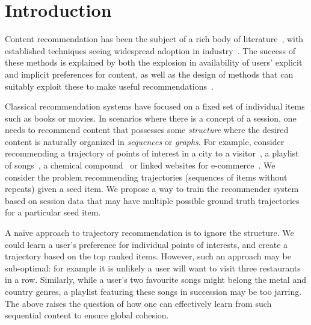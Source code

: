 
\section{Introduction}
\label{sec:intro}

Content recommendation has been the subject of a rich body of literature~\citep{Goldberg:1992,Sarwar:2001,Koren:2010},
with established techniques seeing widespread adoption in industry~\citep{Linden:2003,Agarwal:2013,Amatriain:2015,Gomez-Uribe:2015}.
The success of these methods is explained by both the explosion in availability of users' explicit and implicit preferences for content,
as well as the design of methods that can suitably exploit these to make useful recommendations~\citep{Koren:2009}.

Classical recommendation systems have focused on a fixed set of individual items such as books or movies. In scenarios where there is a concept of a session,
one needs to recommend content that possesses some \emph{structure}
where the desired content is naturally organized in
\emph{sequences} or {\em graphs}.
For example, consider %
recommending a trajectory of points of interest in a city to a visitor~\citep{lu2010photo2trip,lu2012personalized,ijcai15,cikm16paper},
a playlist of songs~\citep{McFee:2011,chen2012playlist,hidasi2015session,choi2016towards},
a chemical compound~\cite{dehaspe1998finding} or linked websites for e-commerce~\cite{antikacioglu2015recommendation}.
We consider the problem recommending trajectories (sequences of items
without repeats) given a seed item.
We propose a way to train the recommender system based on session data that may
have multiple possible ground truth trajectories for a particular seed item.

A na\"{i}ve approach to trajectory recommendation is to ignore the structure.
We could learn a user's preference for individual points of interests,
and create a trajectory based on the top ranked items.
However, such an approach may be sub-optimal:
for example
it is unlikely a user will want to visit three restaurants in a row.
Similarly,
while a user's two favourite songs might belong
the metal and country genres,
a playlist featuring these songs in succession may be too jarring.
The above raises the question of how one can effectively learn from such sequential content to ensure global cohesion.

